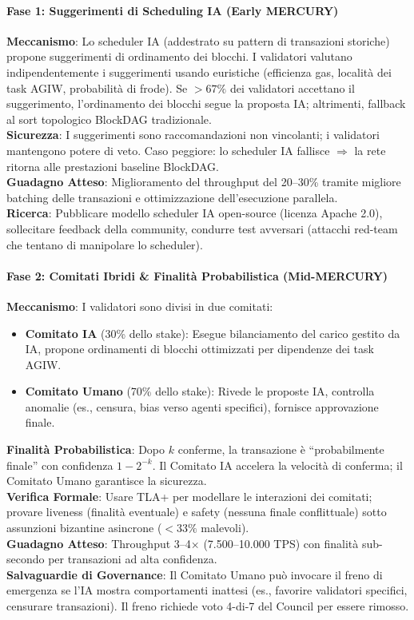 \documentclass[11pt]{article}
\begin{document}
\paragraph{Fase 1: Suggerimenti di Scheduling IA (Early MERCURY)}
\textbf{Meccanismo}: Lo scheduler IA (addestrato su pattern di transazioni storiche) propone suggerimenti di ordinamento dei blocchi. I validatori valutano indipendentemente i suggerimenti usando euristiche (efficienza gas, località dei task AGIW, probabilità di frode). Se $>67\%$ dei validatori accettano il suggerimento, l'ordinamento dei blocchi segue la proposta IA; altrimenti, fallback al sort topologico BlockDAG tradizionale.\\
\textbf{Sicurezza}: I suggerimenti sono raccomandazioni non vincolanti; i validatori mantengono potere di veto. Caso peggiore: lo scheduler IA fallisce $\Rightarrow$ la rete ritorna alle prestazioni baseline BlockDAG.\\
\textbf{Guadagno Atteso}: Miglioramento del throughput del 20--30\% tramite migliore batching delle transazioni e ottimizzazione dell'esecuzione parallela.\\
\textbf{Ricerca}: Pubblicare modello scheduler IA open-source (licenza Apache 2.0), sollecitare feedback della community, condurre test avversari (attacchi red-team che tentano di manipolare lo scheduler).

\paragraph{Fase 2: Comitati Ibridi \& Finalità Probabilistica (Mid-MERCURY)}
\textbf{Meccanismo}: I validatori sono divisi in due comitati:
\begin{itemize}[noitemsep]
  \item \textbf{Comitato IA} (30\% dello stake): Esegue bilanciamento del carico gestito da IA, propone ordinamenti di blocchi ottimizzati per dipendenze dei task AGIW.
  \item \textbf{Comitato Umano} (70\% dello stake): Rivede le proposte IA, controlla anomalie (es., censura, bias verso agenti specifici), fornisce approvazione finale.
\end{itemize}
\textbf{Finalità Probabilistica}: Dopo $k$ conferme, la transazione è ``probabilmente finale'' con confidenza $1 - 2^{-k}$. Il Comitato IA accelera la velocità di conferma; il Comitato Umano garantisce la sicurezza.\\
\textbf{Verifica Formale}: Usare TLA+ per modellare le interazioni dei comitati; provare liveness (finalità eventuale) e safety (nessuna finale conflittuale) sotto assunzioni bizantine asincrone ($<33\%$ malevoli).\\
\textbf{Guadagno Atteso}: Throughput 3--4$\times$ (7.500--10.000 TPS) con finalità sub-secondo per transazioni ad alta confidenza.\\
\textbf{Salvaguardie di Governance}: Il Comitato Umano può invocare il freno di emergenza se l'IA mostra comportamenti inattesi (es., favorire validatori specifici, censurare transazioni). Il freno richiede voto 4-di-7 del Council per essere rimosso.
\end{document}
